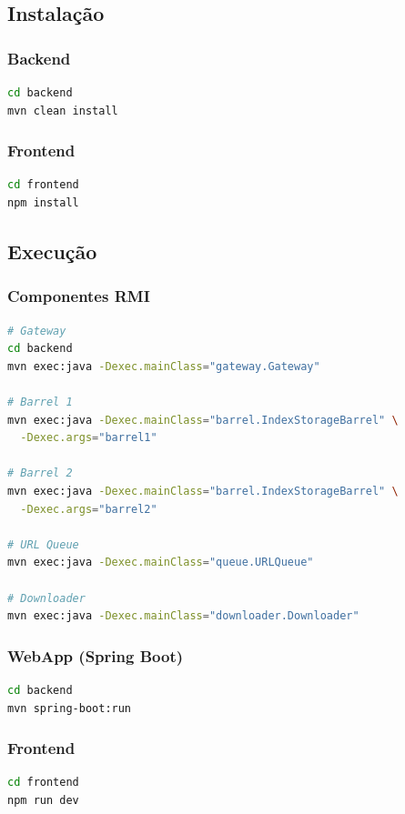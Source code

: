\documentclass[12pt,a4paper]{article}
\begin{document}
\subsection{Instalação}

\subsubsection{Backend}
\begin{lstlisting}[language=bash]
cd backend
mvn clean install
\end{lstlisting}

\subsubsection{Frontend}
\begin{lstlisting}[language=bash]
cd frontend
npm install
\end{lstlisting}

\subsection{Execução}

\subsubsection{Componentes RMI}
\begin{lstlisting}[language=bash]
# Gateway
cd backend
mvn exec:java -Dexec.mainClass="gateway.Gateway"

# Barrel 1
mvn exec:java -Dexec.mainClass="barrel.IndexStorageBarrel" \
  -Dexec.args="barrel1"

# Barrel 2
mvn exec:java -Dexec.mainClass="barrel.IndexStorageBarrel" \
  -Dexec.args="barrel2"

# URL Queue
mvn exec:java -Dexec.mainClass="queue.URLQueue"

# Downloader
mvn exec:java -Dexec.mainClass="downloader.Downloader"
\end{lstlisting}

\subsubsection{WebApp (Spring Boot)}
\begin{lstlisting}[language=bash]
cd backend
mvn spring-boot:run
\end{lstlisting}

\subsubsection{Frontend}
\begin{lstlisting}[language=bash]
cd frontend
npm run dev
\end{lstlisting}
\end{document}
